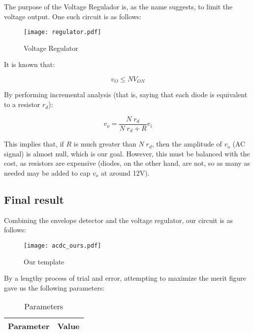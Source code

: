 The purpose of the Voltage Regulador is, as the name suggests, to limit the voltage output. One such circuit is as follows:

\begin{figure}[H]
        \centering
        \texttt{[image: regulator.pdf]}
        \caption{Voltage Regulator}
        \label{envelope}
\end{figure}

It is known that:

\begin{equation}
        v_O \leq N V_{ON}
        \label{max}
\end{equation}

By performing incremental analysis (that is, saying that each diode is equivalent to a resistor $r_d$):

\begin{equation}
        v_o = \frac{N\;r_d}{N\;r_d + R} v_i
        \label{vo}
\end{equation}

This implies that, if $R$ is much greater than $N\;r_d$, then the amplitude of $v_o$ (AC signal) is almost null, which is our goal. However, this must be balanced with the cost, as resistors are expensive (diodes, on the other hand, are not, so as many as needed may be added to cap $v_o$ at around 12V).

\subsection{Final result}

Combining the envelope detector and the voltage regulator, our circuit is as follows:

\begin{figure}[H]
        \centering
        \texttt{[image: acdc\_ours.pdf]}
        \caption{Our template}
        \label{acdc_ours}
\end{figure}

By a lengthy process of trial and error, attempting to maximize the merit figure gave us the following parameters:

\begin{table}[H]
        \centering
        \begin{tabular}{|c|c|}
        \hline
        Parameter & Value \\
        \hline
        
        \hline
        \end{tabular}
        \caption{Parameters}
        \label{param}
\end{table}

